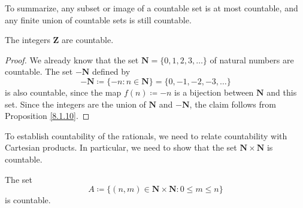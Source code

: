 \begin{note}
    To summarize, any subset or image of a countable set is at most countable, and any finite union of countable sets is still countable.
\end{note}

\begin{corollary}\label{8.1.11}
    The integers \(\mathbf{Z}\) are countable.
\end{corollary}

\begin{proof}
    We already know that the set \(\mathbf{N} = \{0, 1, 2, 3, \dots\}\) of natural numbers are countable.
    The set \(-\mathbf{N}\) defined by
    \[
        -\mathbf{N} \coloneqq \{-n : n \in \mathbf{N}\} = \{0, -1, -2, -3, \dots\}
    \]
    is also countable, since the map \(f(n) \coloneqq -n\) is a bijection between \(\mathbf{N}\) and this set.
    Since the integers are the union of \(\mathbf{N}\) and \(-\mathbf{N}\), the claim follows from Proposition \ref{8.1.10}.
\end{proof}

\begin{note}
    To establish countability of the rationals, we need to relate countability with Cartesian products.
    In particular, we need to show that the set \(\mathbf{N} \times \mathbf{N}\) is countable.
\end{note}

\begin{lemma}\label{8.1.12}
    The set
    \[
        A \coloneqq \{(n, m) \in \mathbf{N} \times \mathbf{N} : 0 \leq m \leq n\}
    \]
    is countable.
\end{lemma}

